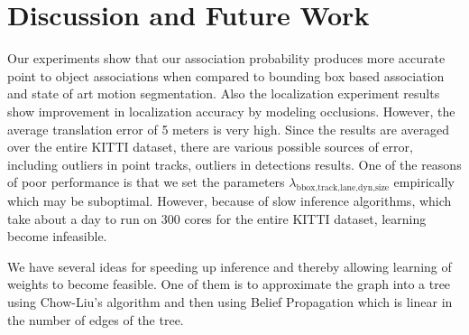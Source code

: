 \section{Discussion and Future Work}
\label{sec:conclusions}

Our experiments show that our association probability produces more accurate
point to object associations when compared to bounding box based
association and state of art motion segmentation.
Also the localization experiment results show improvement in localization accuracy by modeling occlusions. However, the average translation error of 5 meters is very high. Since the results are averaged over the entire KITTI dataset, there are various possible sources of error, including outliers in point tracks, outliers in detections results. 
One of the reasons of poor performance is that we set the parameters $\lambda_{\text{bbox,track,lane,dyn,size}}$ empirically which may be suboptimal. However, because of slow inference algorithms, which take about a day to run on 300 cores for the entire KITTI dataset, learning become infeasible.

We have several ideas for speeding up inference and thereby allowing learning
of weights to become feasible. One of them is to approximate the graph into a
tree using Chow-Liu's \cite{chow1968approximating} algorithm and then using
Belief Propagation which is linear in the number of edges of the tree.
